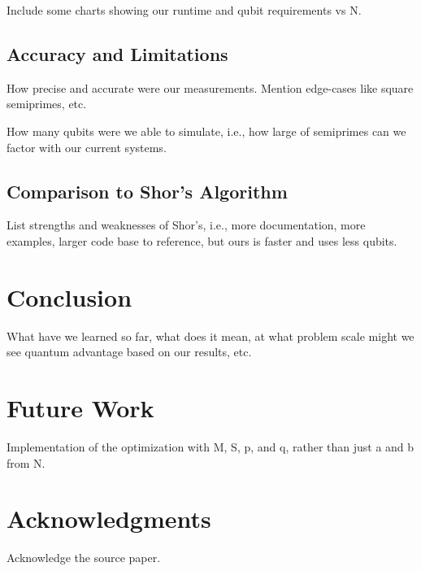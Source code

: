 \documentclass[twocolumn]{cinc}
\begin{document}
Include some charts showing our runtime and qubit requirements vs N.

  \subsection{Accuracy and Limitations}

  How precise and accurate were our measurements. Mention edge-cases like
  square semiprimes, etc.

  How many qubits were we able to simulate, i.e., how large of semiprimes
  can we factor with our current systems.

  \subsection{Comparison to Shor's Algorithm}

  List strengths and weaknesses of Shor's, i.e., more documentation, more
  examples, larger code base to reference, but ours is faster and uses less
  qubits.

\section{Conclusion}

What have we learned so far, what does it mean, at what problem scale might
we see quantum advantage based on our results, etc.

\section{Future Work}
 
Implementation of the optimization with M, S, p, and q, rather than just 
a and b from N.

\section*{Acknowledgments}  
% 
Acknowledge the source paper.




\end{document}
